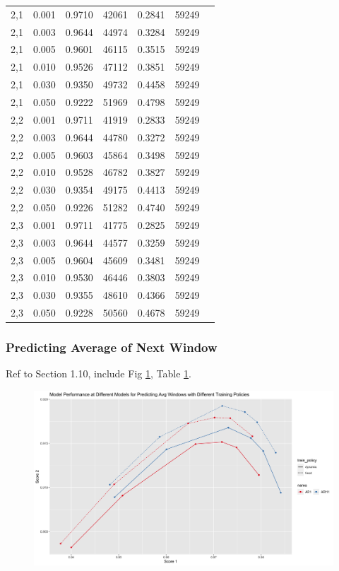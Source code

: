 \documentclass{article}
\begin{document}
\begin{longtable}[htbp]{l|l|l|*{4}{c}}
    2,1 & 0.001 & 0.9710 & 42061 & 0.2841 & 59249\\
    2,1 & 0.003 & 0.9644 & 44974 & 0.3284 & 59249\\
    2,1 & 0.005 & 0.9601 & 46115 & 0.3515 & 59249\\
    2,1 & 0.010 & 0.9526 & 47112 & 0.3851 & 59249\\
    2,1 & 0.030 & 0.9350 & 49732 & 0.4458 & 59249\\
    2,1 & 0.050 & 0.9222 & 51969 & 0.4798 & 59249\\
    2,2 & 0.001 & 0.9711 & 41919 & 0.2833 & 59249\\
    2,2 & 0.003 & 0.9644 & 44780 & 0.3272 & 59249\\
    2,2 & 0.005 & 0.9603 & 45864 & 0.3498 & 59249\\
    2,2 & 0.010 & 0.9528 & 46782 & 0.3827 & 59249\\
    2,2 & 0.030 & 0.9354 & 49175 & 0.4413 & 59249\\
    2,2 & 0.050 & 0.9226 & 51282 & 0.4740 & 59249\\
    2,3 & 0.001 & 0.9711 & 41775 & 0.2825 & 59249\\
    2,3 & 0.003 & 0.9644 & 44577 & 0.3259 & 59249\\
    2,3 & 0.005 & 0.9604 & 45609 & 0.3481 & 59249\\
    2,3 & 0.010 & 0.9530 & 46446 & 0.3803 & 59249\\
    2,3 & 0.030 & 0.9355 & 48610 & 0.4366 & 59249\\
    2,3 & 0.050 & 0.9228 & 50560 & 0.4678 & 59249\\
\end{longtable}

\subsubsection{Predicting Average of Next Window}
Ref to Section 1.10, include Fig \ref{fig:fig1.10.1}, Table \ref{fig:fig1.10.1}.

\begin{figure}
    \caption{}
    \centering
    \includegraphics{images/ModelPerformanceatDifferentModelsforPredictingAvgWindowswithDifferentTrainingPolicies.png}
    \label{fig:fig1.10.1}
\end{figure}
\end{document}
